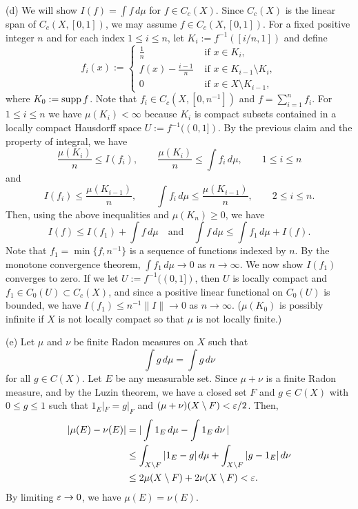 \documentclass{../../large}
\begin{document}
\begin{pf}
(d)
We will show $I(f)=\int f\,d\mu$ for $f\in C_c(X)$.
Since $C_c(X)$ is the linear span of $C_c(X,[0,1])$, we may assume $f\in C_c(X,[0,1])$.
For a fixed positive integer $n$ and for each index $1\le i\le n$, let $K_i:=f^{-1}([i/n,1])$ and define
\[f_i(x):=\begin{cases}\frac1n&\text{ if }x\in K_i,\\f(x)-\frac{i-1}n&\text{ if }x\in K_{i-1}\setminus K_i,\\0&\text{ if }x\in X\setminus K_{i-1},\end{cases}\]
where $K_0:=\operatorname{supp} f$.
Note that $f_i\in C_c(X,[0,n^{-1}])$ and $f=\sum_{i=1}^nf_i$.
For $1\le i\le n$ we have $\mu(K_i)<\infty$ because $K_i$ is compact subsets contained in a locally compact Hausdorff space $U:=f^{-1}((0,1])$.
By the previous claim and the property of integral, we have
\[\frac{\mu(K_i)}n\le I(f_i),\qquad\frac{\mu(K_i)}n\le\int f_i\,d\mu,\qquad1\le i\le n\]
and
\[I(f_i)\le\frac{\mu(K_{i-1})}n,\qquad\int f_i\,d\mu\le\frac{\mu(K_{i-1})}n,\qquad2\le i\le n.\]
Then, using the above inequalities and $\mu(K_n)\ge0$, we have
\[I(f)\le I(f_1)+\int f\,d\mu\quad\text{and}\quad\int f\,d\mu\le\int f_1\,d\mu+I(f).\]
Note that $f_1=\min\{f,n^{-1}\}$ is a sequence of functions indexed by $n$.
By the monotone convergence theorem, $\int f_1\,d\mu\to0$ as $n\to\infty$.
We now show $I(f_1)$ converges to zero.
If we let $U:=f^{-1}((0,1])$, then $U$ is locally compact and $f_1\in C_0(U)\subset C_c(X)$, and since a positive linear functional on $C_0(U)$ is bounded, we have $I(f_1)\le n^{-1}\|I\|\to0$ as $n\to\infty$.
($\mu(K_0)$ is possibly infinite if $X$ is not locally compact so that $\mu$ is not locally finite.)

(e)
Let $\mu$ and $\nu$ be finite Radon measures on $X$ such that
\[\int g\,d\mu=\int g\,d\nu\]
for all $g\in C(X)$.
Let $E$ be any measurable set.
Since $\mu+\nu$ is a finite Radon measure, and by the Luzin theorem, we have a closed set $F$ and $g\in C(X)$ with $0\le g\le1$ such that $1_E|_F=g|_F$ and $(\mu+\nu)(X\setminus F)<\varepsilon/2$.
Then,
\begin{align*}
|\mu(E)-\nu(E)|&=|\int1_E\,d\mu-\int1_E\,d\nu\,|\\
&\le\int_{X\setminus F}|1_E-g|\,d\mu+\int_{X\setminus F}|g-1_E|\,d\nu\\
&\le2\mu(X\setminus F)+2\nu(X\setminus F)<\varepsilon.
\end{align*}
By limiting $\varepsilon\to0$, we have $\mu(E)=\nu(E)$.
\end{pf}


\begin{prb}
\end{prb}
\end{document}
